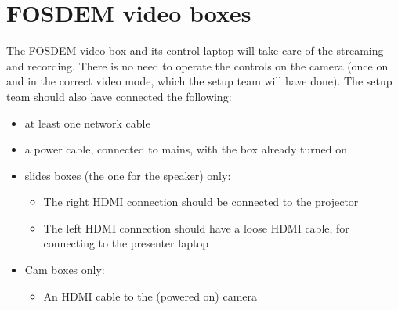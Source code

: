 \documentclass{article}
\begin{document}
\section{FOSDEM video boxes}
The FOSDEM video box and its control laptop will take care of the streaming and recording.
There is no need to operate the controls on the camera (once on and in the correct video mode, which the setup team will have done). The setup team should also have connected the following:
\begin{itemize}
  \item at least one network cable
  \item a power cable, connected to mains, with the box already turned on
  \item slides boxes (the one for the speaker) only:
    \begin{itemize}
      \item The right HDMI connection should be connected to the projector
      \item The left HDMI connection should have a loose HDMI cable, for connecting to the presenter laptop
    \end{itemize}
  \item Cam boxes only:
    \begin{itemize}
      \item An HDMI cable to the (powered on) camera
    \end{itemize}
\end{itemize}

\end{document}
